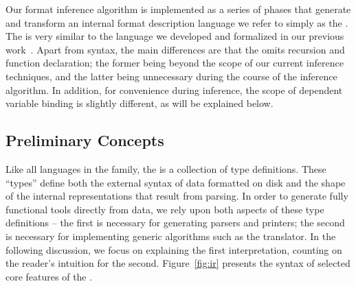 Our format inference algorithm is implemented as a series of phases that
generate and transform an internal format description language we
refer to simply as the \ir.  The \ir{} is very similar to
the \ipads{} language we developed and formalized in our previous 
work~\cite{fisher+:popl06}.  Apart from syntax, the main differences 
are that the \ir{} omits recursion and function declaration; the former
being beyond the scope of our current inference techniques, and the 
latter being unnecessary during the course of the inference algorithm.  
In addition, for convenience during inference, the scope of dependent 
variable binding is slightly different, as will be explained below.

\subsection{Preliminary Concepts}

Like all languages in the \pads{} family, the \ir{} is a collection of
type definitions.  These ``types'' define both the external syntax of
data formatted on disk and the shape of the internal representations
that result from parsing.  In order to generate fully functional tools
directly from data, we rely upon both aspects of these type definitions
-- the first is necessary for generating parsers and printers; the
second is necessary for implementing generic algorithms such as the 
\xml{} translator.  In the following discussion, we focus on
explaining the first interpretation, counting on the reader's intuition 
for the second.  Figure~\ref{fig:ir} presents the syntax of
selected core features of the \ir{}.



